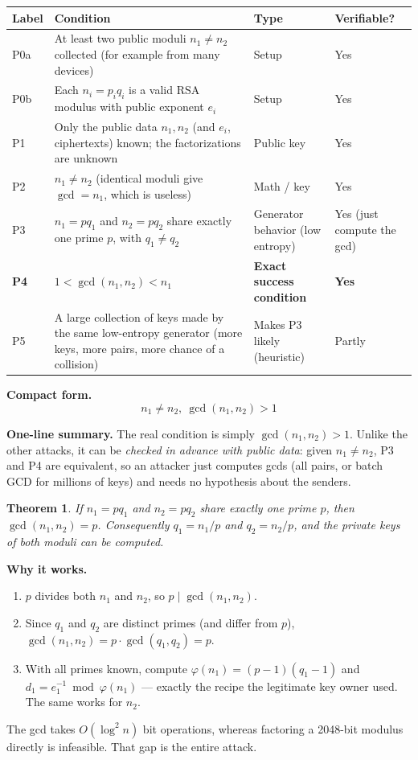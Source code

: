 \documentclass[11pt]{article}
\newtheorem{theorem}{Theorem}[section]
\theoremstyle{definition}
\theoremstyle{remark}
\newcommand{\minorhead}[1]{\par\medskip\noindent{\large\bfseries\itshape #1}\par\nopagebreak\smallskip}
\begin{document}
\minorhead{Setup}
\begin{center}
\begin{tabular}{@{}>{\raggedright\arraybackslash}p{1.1cm}>{\raggedright\arraybackslash}p{7.9cm}>{\raggedright\arraybackslash}p{3.4cm}>{\raggedright\arraybackslash}p{2.6cm}@{}}
\toprule
\textbf{Label} & \textbf{Condition} & \textbf{Type} & \textbf{Verifiable?} \\
\midrule
P0a & At least two public moduli $n_1\ne n_2$ collected (for example from many devices) & Setup & Yes \\
P0b & Each $n_i=p_iq_i$ is a valid RSA modulus with public exponent $e_i$ & Setup & Yes \\
P1 & Only the public data $n_1,n_2$ (and $e_i$, ciphertexts) known; the factorizations are unknown & Public key & Yes \\
P2 & $n_1\ne n_2$ (identical moduli give $\gcd=n_1$, which is useless) & Math / key & Yes \\
P3 & $n_1=pq_1$ and $n_2=pq_2$ share exactly one prime $p$, with $q_1\ne q_2$ & Generator behavior (low entropy) & Yes (just compute the gcd) \\
\textbf{P4} & \textbf{$1<\gcd(n_1,n_2)<n_1$} & \textbf{Exact success condition} & \textbf{Yes} \\
P5 & A large collection of keys made by the same low-entropy generator (more keys, more pairs, more chance of a collision) & Makes P3 likely (heuristic) & Partly \\
\bottomrule
\end{tabular}
\end{center}

\textbf{Compact form.}
\[
\boxed{\;n_1\ne n_2,\ \gcd(n_1,n_2)>1\;}
\]

\textbf{One-line summary.} The real condition is simply $\gcd(n_1,n_2)>1$. Unlike the other attacks, it can be \emph{checked in advance with public data}: given $n_1\ne n_2$, P3 and P4 are equivalent, so an attacker just computes gcds (all pairs, or batch GCD for millions of keys) and needs no hypothesis about the senders.

\begin{theorem}\label{thm:sharedprime}
If $n_1=pq_1$ and $n_2=pq_2$ share exactly one prime $p$, then $\gcd(n_1,n_2)=p$. Consequently $q_1=n_1/p$ and $q_2=n_2/p$, and the private keys of \emph{both} moduli can be computed.
\end{theorem}

\textbf{Why it works.}
\begin{enumerate}[nosep]
\item $p$ divides both $n_1$ and $n_2$, so $p\mid\gcd(n_1,n_2)$.
\item Since $q_1$ and $q_2$ are distinct primes (and differ from $p$), $\gcd(n_1,n_2)=p\cdot\gcd(q_1,q_2)=p$.
\item With all primes known, compute $\varphi(n_1)=(p-1)(q_1-1)$ and $d_1=e_1^{-1}\bmod\varphi(n_1)$ --- exactly the recipe the legitimate key owner used. The same works for $n_2$.
\end{enumerate}
The gcd takes $O(\log^2 n)$ bit operations, whereas factoring a 2048-bit modulus directly is infeasible. That gap is the entire attack.
\end{document}
